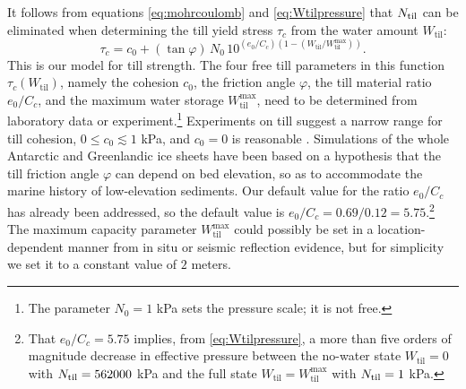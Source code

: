 \documentclass[11pt,final]{amsart}
\newcommand{\Wtil}{W_{\text{til}}}
\newcommand{\Wtilmax}{W_{\text{til}}^{\text{max}}}
\begin{document}
It follows from equations \eqref{eq:mohrcoulomb} and \eqref{eq:Wtilpressure} that $N_{\text{til}}$ can be eliminated when determining the till yield stress $\tau_c$ from the water amount $\Wtil$:
\begin{equation}
\tau_c = c_0 + (\tan \varphi)\, N_0\, 10^{(e_0/C_c) \left(1 - (\Wtil/\Wtilmax)\right)}. \label{eq:taucfromWtil}
\end{equation}
This is our model for till strength.  The four free till parameters in this function $\tau_c(\Wtil)$, namely the cohesion $c_0$, the friction angle $\varphi$, the till material ratio $e_0/C_c$, and the maximum water storage $\Wtilmax$, need to be determined from laboratory data or experiment.\footnote{The parameter $N_0=1$ kPa sets the pressure scale; it is not free.}  Experiments on till suggest a narrow range for till cohesion, $0 \le c_0 \lesssim 1$ kPa, and $c_0=0$ is reasonable \citep{Tulaczyketal2000}.  Simulations of the whole Antarctic \citep{Martinetal2011} and Greenlandic \citep[see supplement]{AschwandenAdalgeirsdottirKhroulev} ice sheets have been based on a hypothesis that the till friction angle $\varphi$ can depend on bed elevation, so as to accommodate the marine history of low-elevation sediments.  Our default value for the ratio $e_0/C_c$has already been addressed, so the default value is $e_0/C_c=0.69/0.12=5.75$.\footnote{That $e_0/C_c=5.75$ implies, from \eqref{eq:Wtilpressure}, a more than five orders of magnitude decrease in effective pressure between the no-water state $\Wtil=0$ with $N_{\text{til}} = 562000$ kPa and the full state $\Wtil=\Wtilmax$ with $N_{\text{til}} = 1$ kPa.}  The maximum capacity parameter $\Wtilmax$ could possibly be set in a location-dependent manner from in situ \citep{Tulaczyketal2000} or seismic reflection \citep{TrufferHarrisonEchelmeyer2000} evidence, but for simplicity we set it to a constant value of $2$ meters.
\end{document}
